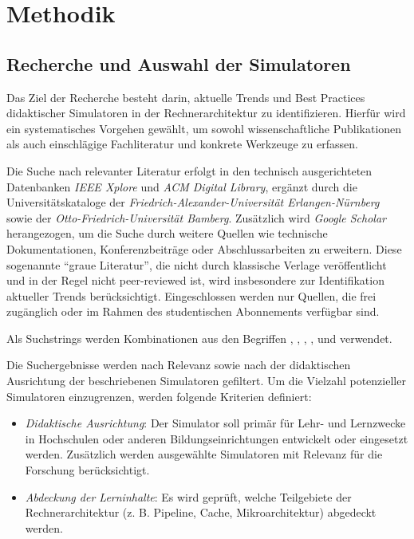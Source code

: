 \chapter{Methodik}

\section{Recherche und Auswahl der Simulatoren}

Das Ziel der Recherche besteht darin, aktuelle Trends und Best Practices didaktischer Simulatoren in der Rechnerarchitektur zu identifizieren. Hierfür wird ein systematisches Vorgehen gewählt, um sowohl wissenschaftliche Publikationen als auch einschlägige Fachliteratur und konkrete Werkzeuge zu erfassen.

Die Suche nach relevanter Literatur erfolgt in den technisch ausgerichteten Datenbanken \textit{IEEE Xplore} und \textit{ACM Digital Library}, ergänzt durch die Universitätskataloge der \textit{Friedrich-Alexander-Universität Erlangen-Nürnberg} sowie der \textit{Otto-Friedrich-Universität Bamberg}. Zusätzlich wird \textit{Google Scholar} herangezogen, um die Suche durch weitere Quellen wie technische Dokumentationen, Konferenzbeiträge oder Abschlussarbeiten zu erweitern. Diese sogenannte \enquote{graue Literatur}, die nicht durch klassische Verlage veröffentlicht und in der Regel nicht peer-reviewed ist, wird insbesondere zur Identifikation aktueller Trends berücksichtigt. Eingeschlossen werden nur Quellen, die frei zugänglich oder im Rahmen des studentischen Abonnements verfügbar sind.

Als Suchstrings werden Kombinationen aus den Begriffen \textit{}, \textit{}, \textit{}, \textit{}, \textit{} und \textit{} verwendet.

Die Suchergebnisse werden nach Relevanz sowie nach der didaktischen Ausrichtung der beschriebenen Simulatoren gefiltert. Um die Vielzahl potenzieller Simulatoren einzugrenzen, werden folgende Kriterien definiert:

\begin{itemize}
  \item \textit{Didaktische Ausrichtung}: Der Simulator soll primär für Lehr- und Lernzwecke in Hochschulen oder anderen Bildungseinrichtungen entwickelt oder eingesetzt werden. Zusätzlich werden ausgewählte Simulatoren mit Relevanz für die Forschung berücksichtigt.
  \item \textit{Abdeckung der Lerninhalte}: Es wird geprüft, welche Teilgebiete der Rechnerarchitektur (z. B. Pipeline, Cache, Mikroarchitektur) abgedeckt werden.
\end{itemize}

